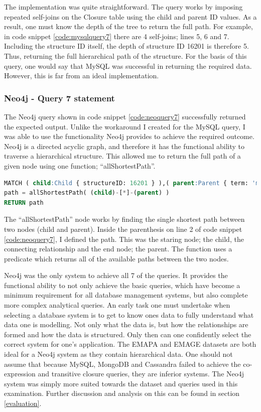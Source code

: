 The implementation was quite straightforward. The query works by imposing repeated self-joins on the Closure table using the child and parent ID values. As a result, one must know the depth of the tree to return the full path. For example, in code snippet \ref{code:mysqlquery7} there are 4 self-joins; lines 5, 6 and 7. Including the structure ID itself, the depth of structure ID 16201 is therefore 5. Thus, returning the full hierarchical path of the structure. For the basis of this query, one would say that MySQL was successful in returning the required data. However, this is far from an ideal implementation.

\subsubsection*{Neo4j - Query 7 statement}\label{neoquery7statement}
The Neo4j query shown in code snippet \ref{code:neoquery7} successfully returned the expected output. Unlike the workaround I created for the MySQL query, I was able to use the functionality Neo4j provides to achieve the required outcome. Neo4j is a directed acyclic graph, and therefore it has the functional ability to traverse a hierarchical structure. This allowed me to return the full path of a given node using one function; ``allShortestPath''. 

\begin{lstlisting}[language=SQL, caption=Neo4j query 7 statement. Calculate transitive closure., label=code:neoquery7]
MATCH ( child:Child { structureID: 16201 } ),( parent:Parent { term: 'mouse'  } ),
path = allShortestPath( (child)-[*]-(parent) )
RETURN path
\end{lstlisting}

The ``allShortestPath'' node works by finding the single shortest path between two nodes (child and parent). Inside the parenthesis on line 2 of code snippet \ref{code:neoquery7}, I defined the path. This was the staring node; the child, the connecting relationship and the end node; the parent. The function uses a predicate which returns all of the available paths between the two nodes.

Neo4j was the only system to achieve all 7 of the queries. It provides the functional ability to not only achieve the basic queries, which have become a minimum requirement for all database management systems, but also complete more complex analytical queries. An early task one must undertake when selecting a database system is to get to know ones data to fully understand what data one is modelling. Not only what the data is, but how the relationships are formed and how the data is structured. Only then can one confidently select the correct system for one's application. The EMAPA and EMAGE datasets are both ideal for a Neo4j system as they contain hierarchical data. One should not assume that because MySQL, MongoDB and Cassandra failed to achieve the co-expression and transitive closure queries, they are inferior systems. The Neo4j system was simply more suited towards the dataset and queries used in this examination. Further discussion and analysis on this can be found in section \ref{evaluation}.